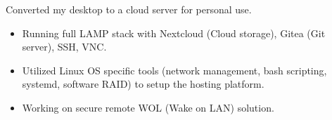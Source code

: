 Converted my desktop to a cloud server for personal use. 
\medskip
\begin{itemize}
  \item Running full LAMP stack with Nextcloud (Cloud storage), Gitea (Git server), SSH, VNC.
  \item Utilized Linux OS specific tools (network management, bash scripting, systemd, software RAID) to setup the hosting platform.
  \item Working on secure remote WOL (Wake on LAN) solution.
\end{itemize}
